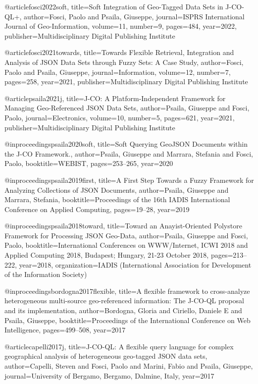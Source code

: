 @article{fosci2022soft,
  title={Soft Integration of Geo-Tagged Data Sets in J-CO-QL+},
  author={Fosci, Paolo and Psaila, Giuseppe},
  journal={ISPRS International Journal of Geo-Information},
  volume={11},
  number={9},
  pages={484},
  year={2022},
  publisher={Multidisciplinary Digital Publishing Institute}
}

@article{fosci2021towards,
  title={Towards Flexible Retrieval, Integration and Analysis of JSON Data Sets through Fuzzy Sets: A Case Study},
  author={Fosci, Paolo and Psaila, Giuseppe},
  journal={Information},
  volume={12},
  number={7},
  pages={258},
  year={2021},
  publisher={Multidisciplinary Digital Publishing Institute}
}

@article{psaila2021j,
  title={J-CO: A Platform-Independent Framework for Managing Geo-Referenced JSON Data Sets},
  author={Psaila, Giuseppe and Fosci, Paolo},
  journal={Electronics},
  volume={10},
  number={5},
  pages={621},
  year={2021},
  publisher={Multidisciplinary Digital Publishing Institute}
}

@inproceedings{psaila2020soft,
  title={Soft Querying GeoJSON Documents within the J-CO Framework.},
  author={Psaila, Giuseppe and Marrara, Stefania and Fosci, Paolo},
  booktitle={WEBIST},
  pages={253--265},
  year={2020}
}

@inproceedings{psaila2019first,
  title={A First Step Towards a Fuzzy Framework for Analyzing Collections of JSON Documents},
  author={Psaila, Giuseppe and Marrara, Stefania},
  booktitle={Proceedings of the 16th IADIS International Conference on Applied Computing},
  pages={19--28},
  year={2019}
}

@inproceedings{psaila2018toward,
  title={Toward an Anayist-Oriented Polystore Framework for Processing JSON Geo-Data},
  author={Psaila, Giuseppe and Fosci, Paolo},
  booktitle={International Conferences on WWW/Internet, ICWI 2018 and Applied Computing 2018, Budapest; Hungary, 21-23 October 2018},
  pages={213--222},
  year={2018},
  organization={IADIS (International Association for Development of the Information Society)}
}

@inproceedings{bordogna2017flexible,
  title={A flexible framework to cross-analyze heterogeneous multi-source geo-referenced information: The J-CO-QL proposal and its implementation},
  author={Bordogna, Gloria and Ciriello, Daniele E and Psaila, Giuseppe},
  booktitle={Proceedings of the International Conference on Web Intelligence},
  pages={499--508},
  year={2017}
}

@article{capelli2017j,
  title={J-CO-QL: A flexible query language for complex geographical analysis of heterogeneous geo-tagged JSON data sets},
  author={Capelli, Steven and Fosci, Paolo and Marini, Fabio and Psaila, Giuseppe},
  journal={University of Bergamo, Bergamo, Dalmine, Italy},
  year={2017}
}

